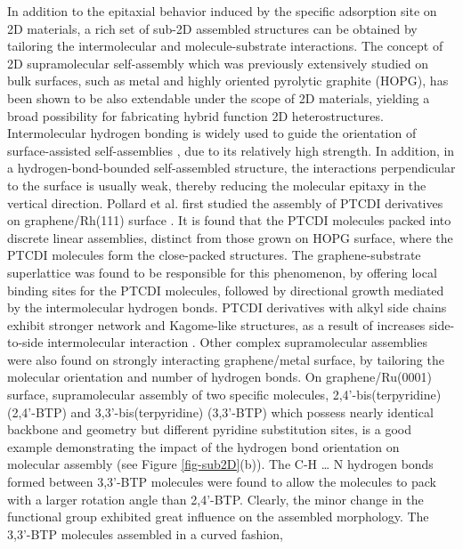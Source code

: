 In addition to the epitaxial behavior induced by the specific
adsorption site on 2D materials, a rich set of sub-2D assembled
structures can be obtained by tailoring the intermolecular and
molecule-substrate interactions. The concept of 2D supramolecular
self-assembly \cite{De_Feyter_2003_2D_assem_rev,Philips_2D_assem_book}
which was previously extensively studied on bulk surfaces, such as
metal and highly oriented pyrolytic graphite (HOPG), has been shown to
be also extendable under the scope of 2D materials, yielding a broad
possibility for fabricating hybrid function 2D
heterostructures. Intermolecular hydrogen bonding is widely used to
guide the orientation of surface-assisted self-assemblies
\cite{Slater_2014_HBond_assembl_rev}, due to its relatively high
strength. In addition, in a hydrogen-bond-bounded self-assembled
structure, the interactions perpendicular to the surface is usually
weak, thereby reducing the molecular epitaxy in the vertical
direction. Pollard et al. first studied the assembly of PTCDI
derivatives on graphene/Rh(111) surface
\cite{Pollard_2010_hbond_assembly_gr}. It is found that the PTCDI
molecules packed into discrete linear assemblies, distinct from those
grown on HOPG surface, where the PTCDI molecules form the close-packed
structures. The graphene-substrate superlattice was found to be
responsible for this phenomenon, by offering local binding sites for
the PTCDI molecules, followed by directional growth mediated by the
intermolecular hydrogen bonds. PTCDI derivatives with alkyl side
chains exhibit stronger network and Kagome-like structures, as a
result of increases side-to-side intermolecular interaction
\cite{Pollard_2010_hbond_assembly_gr}. Other complex supramolecular
assemblies were also found on strongly interacting graphene/metal
surface, by tailoring the molecular orientation and number of hydrogen
bonds. On graphene/Ru(0001) surface, supramolecular assembly of two
specific molecules, 2,4'-bis(terpyridine) (2,4'-BTP) and
3,3'-bis(terpyridine) (3,3'-BTP) which possess nearly identical
backbone and geometry but different pyridine substitution sites, is a
good example demonstrating the impact of the hydrogen bond orientation
on molecular assembly
\cite{Meier_2010_polycyclic_gr,Roos_2011_BTP_gr,Roos_2011_hiera_org_gr}
(see Figure \ref{fig-sub2D}(b)).  The C-H \dots{} N hydrogen bonds formed
between 3,3'-BTP molecules were found to allow the molecules to pack
with a larger rotation angle than 2,4'-BTP. Clearly, the minor change
in the functional group exhibited great influence on the assembled
morphology. The 3,3'-BTP molecules assembled in a curved fashion,
